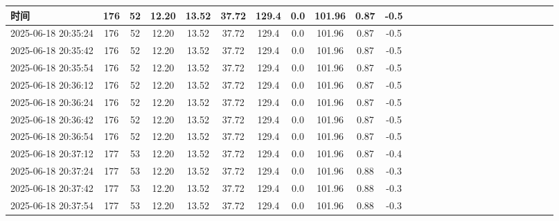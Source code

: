 \documentclass[UTF8,10pt,a4paper,fontset=fandol]{ctexart}
\begin{document}
\scriptsize
\begin{tabular}{|p{2.15cm}|*{25}{c|}}
\hline
时间 & 176 & 52 & 12.20 & 13.52 & 37.72 & 129.4 & 0.0 & 101.96 & 0.87 & -0.5 &
\z & \z & \z & \z & \z & \z & \z & \z & \z & \z & \z & \z & \z & \z & \z \\ \hline
2025-06-18 20:35:24 & 176 & 52 & 12.20 & 13.52 & 37.72 & 129.4 & 0.0 & 101.96 & 0.87 & -0.5 & \z & \z & \z & \z & \z & \z & \z & \z & \z & \z & \z & \z & \z & \z & \z \\ \hline
2025-06-18 20:35:42 & 176 & 52 & 12.20 & 13.52 & 37.72 & 129.4 & 0.0 & 101.96 & 0.87 & -0.5 & \z & \z & \z & \z & \z & \z & \z & \z & \z & \z & \z & \z & \z & \z & \z \\ \hline
2025-06-18 20:35:54 & 176 & 52 & 12.20 & 13.52 & 37.72 & 129.4 & 0.0 & 101.96 & 0.87 & -0.5 & \z & \z & \z & \z & \z & \z & \z & \z & \z & \z & \z & \z & \z & \z & \z \\ \hline
2025-06-18 20:36:12 & 176 & 52 & 12.20 & 13.52 & 37.72 & 129.4 & 0.0 & 101.96 & 0.87 & -0.5 & \z & \z & \z & \z & \z & \z & \z & \z & \z & \z & \z & \z & \z & \z & \z \\ \hline
2025-06-18 20:36:24 & 176 & 52 & 12.20 & 13.52 & 37.72 & 129.4 & 0.0 & 101.96 & 0.87 & -0.5 & \z & \z & \z & \z & \z & \z & \z & \z & \z & \z & \z & \z & \z & \z & \z \\ \hline
2025-06-18 20:36:42 & 176 & 52 & 12.20 & 13.52 & 37.72 & 129.4 & 0.0 & 101.96 & 0.87 & -0.5 & \z & \z & \z & \z & \z & \z & \z & \z & \z & \z & \z & \z & \z & \z & \z \\ \hline
2025-06-18 20:36:54 & 176 & 52 & 12.20 & 13.52 & 37.72 & 129.4 & 0.0 & 101.96 & 0.87 & -0.5 & \z & \z & \z & \z & \z & \z & \z & \z & \z & \z & \z & \z & \z & \z & \z \\ \hline
2025-06-18 20:37:12 & 177 & 53 & 12.20 & 13.52 & 37.72 & 129.4 & 0.0 & 101.96 & 0.87 & -0.4 & \z & \z & \z & \z & \z & \z & \z & \z & \z & \z & \z & \z & \z & \z & \z \\ \hline
2025-06-18 20:37:24 & 177 & 53 & 12.20 & 13.52 & 37.72 & 129.4 & 0.0 & 101.96 & 0.88 & -0.3 & \z & \z & \z & \z & \z & \z & \z & \z & \z & \z & \z & \z & \z & \z & \z \\ \hline
2025-06-18 20:37:42 & 177 & 53 & 12.20 & 13.52 & 37.72 & 129.4 & 0.0 & 101.96 & 0.88 & -0.3 & \z & \z & \z & \z & \z & \z & \z & \z & \z & \z & \z & \z & \z & \z & \z \\ \hline
2025-06-18 20:37:54 & 177 & 53 & 12.20 & 13.52 & 37.72 & 129.4 & 0.0 & 101.96 & 0.88 & -0.3 & \z & \z & \z & \z & \z & \z & \z & \z & \z & \z & \z & \z & \z & \z & \z \\ \hline

\end{tabular}
\end{document}
